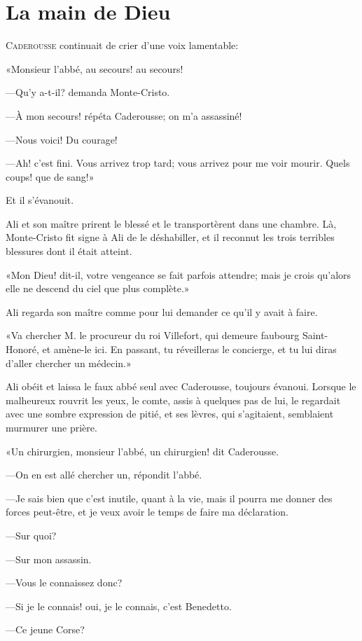 \chapter{La main de Dieu}

\lettrine{C}{aderousse} continuait de crier d'une voix lamentable: 

\zz
«Monsieur l'abbé, au secours! au secours! 

\zz
—Qu'y a-t-il? demanda Monte-Cristo. 

\zz
—À mon secours! répéta Caderousse; on m'a assassiné! 

—Nous voici! Du courage! 

—Ah! c'est fini. Vous arrivez trop tard; vous arrivez pour me voir mourir. Quels coups! que de sang!» 

Et il s'évanouit. 

Ali et son maître prirent le blessé et le transportèrent dans une chambre. Là, Monte-Cristo fit signe à Ali de le déshabiller, et il reconnut les trois terribles blessures dont il était atteint. 

«Mon Dieu! dit-il, votre vengeance se fait parfois attendre; mais je crois qu'alors elle ne descend du ciel que plus complète.» 

Ali regarda son maître comme pour lui demander ce qu'il y avait à faire. 

«Va chercher M. le procureur du roi Villefort, qui demeure faubourg Saint-Honoré, et amène-le ici. En passant, tu réveilleras le concierge, et tu lui diras d'aller chercher un médecin.» 

Ali obéit et laissa le faux abbé seul avec Caderousse, toujours évanoui. Lorsque le malheureux rouvrit les yeux, le comte, assis à quelques pas de lui, le regardait avec une sombre expression de pitié, et ses lèvres, qui s'agitaient, semblaient murmurer une prière. 

«Un chirurgien, monsieur l'abbé, un chirurgien! dit Caderousse. 

—On en est allé chercher un, répondit l'abbé. 

—Je sais bien que c'est inutile, quant à la vie, mais il pourra me donner des forces peut-être, et je veux avoir le temps de faire ma déclaration. 

—Sur quoi? 

—Sur mon assassin. 

—Vous le connaissez donc? 

—Si je le connais! oui, je le connais, c'est Benedetto. 

—Ce jeune Corse? 

